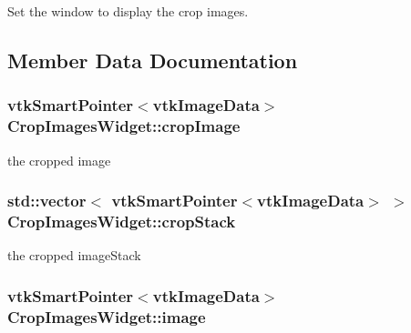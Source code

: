 Set the window to display the crop images. 



\subsection{Member Data Documentation}
\hypertarget{class_crop_images_widget_afafb6d17550677101da809f2d2b795dc}{
\subsubsection[{crop\-Image}]{\setlength{\rightskip}{0pt plus 5cm}vtk\-Smart\-Pointer$<$vtk\-Image\-Data$>$ {\bf Crop\-Images\-Widget\-::crop\-Image}}}\label{d0/d3c/class_crop_images_widget_afafb6d17550677101da809f2d2b795dc}


the cropped image 

\hypertarget{class_crop_images_widget_a03f87c8aabe879b16e585dae60d4415b}{
\subsubsection[{crop\-Stack}]{\setlength{\rightskip}{0pt plus 5cm}std\-::vector$<$ vtk\-Smart\-Pointer$<$vtk\-Image\-Data$>$ $>$ {\bf Crop\-Images\-Widget\-::crop\-Stack}}}\label{d0/d3c/class_crop_images_widget_a03f87c8aabe879b16e585dae60d4415b}


the cropped image\-Stack 

\hypertarget{class_crop_images_widget_ab160815d191ed30e0c6b8a905818ab3b}{
\subsubsection[{image}]{\setlength{\rightskip}{0pt plus 5cm}vtk\-Smart\-Pointer$<$vtk\-Image\-Data$>$ {\bf Crop\-Images\-Widget\-::image}}}\label{d0/d3c/class_crop_images_widget_ab160815d191ed30e0c6b8a905818ab3b}



